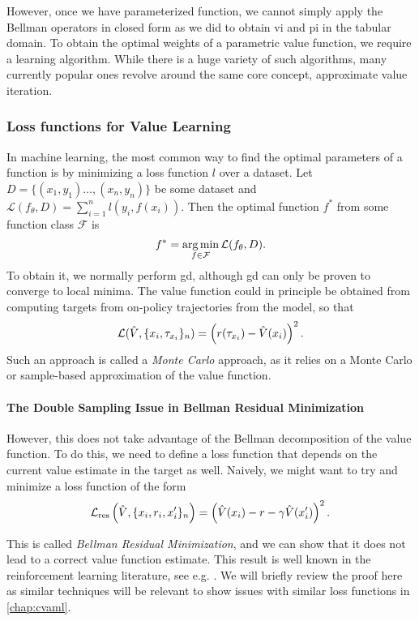 However, once we have parameterized function, we cannot simply apply the Bellman operators in closed form as we did to obtain \ac{vi} and \ac{pi} in the tabular domain.
To obtain the optimal weights of a parametric value function, we require a learning algorithm.
While there is a huge variety of such algorithms, many currently popular ones revolve around the same core concept, approximate value iteration.

\subsubsection{Loss functions for Value Learning}

In machine learning, the most common way to find the optimal parameters of a function is by minimizing a loss function $l$ over a dataset.
Let $D = \{(x_1, y_1) \dots, (x_n, y_n)\}$ be some dataset and $\mathcal{L}(f_\theta,D) = \sum_{i=1}^n l(y_i, f(x_i))$.
Then the optimal function $f^*$ from some function class $\mathcal{F}$ is $$f^* = \operatorname*{arg\,min}_{f \in \mathcal{F}} \mathcal{L}(f_\theta,D).$$
To obtain it, we normally perform \ac{gd}, although \ac{gd} can only be proven to converge to local minima.
The value function could in principle be obtained from computing targets from on-policy trajectories from the model, so that $$\mathcal{L}(\hat{V}, \{x_i, \tau_{x_i}\}_n) = \left(r(\tau_{x_i}) - \hat{V}(x_i)\right)^2.$$
Such an approach is called a \emph{Monte Carlo} approach, as it relies on a Monte Carlo or sample-based approximation of the value function.

\paragraph{The Double Sampling Issue in Bellman Residual Minimization}
However, this does not take advantage of the Bellman decomposition of the value function.
To do this, we need to define a loss function that depends on the current value estimate in the target as well.
Naively, we might want to try and minimize a loss function of the form
$$\mathcal{L}_\mathrm{res}\left(\hat{V}, \{x_i, r_i, x'_i\}_{n}\right) = \left(\hat{V}(x_i) - r - \gamma \hat{V}(x'_i)\right)^2.$$

This is called \emph{Bellman Residual Minimization}, and we can show that it does not lead to a correct value function estimate.
This result is well known in the reinforcement learning literature, see e.g. \textcite[p. 299]{suttonbook}.
We will briefly review the proof here as similar techniques will be relevant to show issues with similar loss functions in \autoref{chap:cvaml}.


